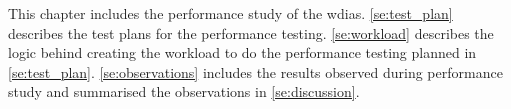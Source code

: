 
This chapter includes the performance study of the \acrshort{wdias}. \cref{se:test_plan} describes the test plans for the performance testing.
\cref{se:workload} describes the logic behind creating the workload to do the performance testing planned in \cref{se:test_plan}.
\cref{se:observations} includes the results observed during performance study and summarised the observations in \cref{se:discussion}.
